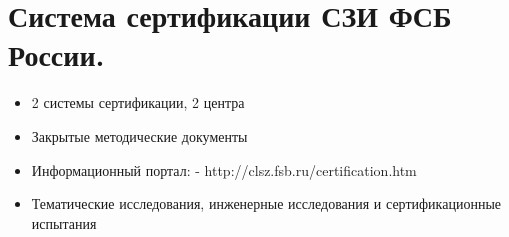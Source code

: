 \section{Система сертификации СЗИ ФСБ России.}

\begin{itemize}
	\item 2 системы сертификации, 2 центра
	\item Закрытые методические документы
	\item Информационный портал: - http://clsz.fsb.ru/certification.htm
	\item Тематические исследования, инженерные исследования и сертификационные испытания
\end{itemize}